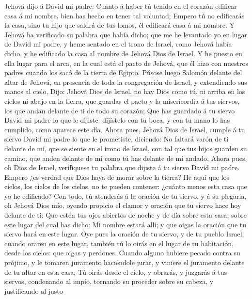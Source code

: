 Jehová dijo á David mi padre: Cuanto á haber tú tenido en el corazón
edificar casa á mi nombre, bien has hecho en tener tal voluntad;
 Empero tú no edificarás la casa, sino tu hijo que saldrá
de tus lomos, él edificará casa á mi nombre.  Y Jehová ha
verificado su palabra que había dicho; que me he levantado yo en lugar
de David mi padre, y heme sentado en el trono de Israel, como Jehová
había dicho, y he edificado la casa al nombre de Jehová Dios de Israel.
 Y he puesto en ella lugar para el arca, en la cual está
el pacto de Jehová, que él hizo con nuestros padres cuando los sacó de
la tierra de Egipto.  Púsose luego Salomón delante del
altar de Jehová, en presencia de toda la congregación de Israel, y
extendiendo sus manos al cielo,  Dijo: Jehová Dios de
Israel, no hay Dios como tú, ni arriba en los cielos ni abajo en la
tierra, que guardas el pacto y la misericordia á tus siervos, los que
andan delante de ti de todo su corazón;  Que has guardado
á tu siervo David mi padre lo que le dijiste: dijístelo con tu boca, y
con tu mano lo has cumplido, como aparece este día. 
Ahora pues, Jehová Dios de Israel, cumple á tu siervo David mi padre lo
que le prometiste, diciendo: No faltará varón de ti delante de mí, que
se siente en el trono de Israel, con tal que tus hijos guarden su
camino, que anden delante de mí como tú has delante de mí andado.
 Ahora pues, oh Dios de Israel, verifíquese tu palabra
que dijiste á tu siervo David mi padre.  Empero ¿es
verdad que Dios haya de morar sobre la tierra? He aquí que los cielos,
los cielos de los cielos, no te pueden contener: ¿cuánto menos esta casa
que yo he edificado?  Con todo, tú atenderás á la oración
de tu siervo, y á su plegaria, oh Jehová Dios mío, oyendo propicio el
clamor y oración que tu siervo hace hoy delante de ti: 
Que estén tus ojos abiertos de noche y de día sobre esta casa, sobre
este lugar del cual has dicho: Mi nombre estará allí; y que oigas la
oración que tu siervo hará en este lugar.  Oye pues la
oración de tu siervo, y de tu pueblo Israel; cuando oraren en este
lugar, también tú lo oirás en el lugar de tu habitación, desde los
cielos: que oigas y perdones.  Cuando alguno hubiere
pecado contra su prójimo, y le tomaren juramento haciéndole jurar, y
viniere el juramento delante de tu altar en esta casa; 
Tú oirás desde el cielo, y obrarás, y juzgarás á tus siervos, condenando
al impío, tornando su proceder sobre su cabeza, y justificando al justo
